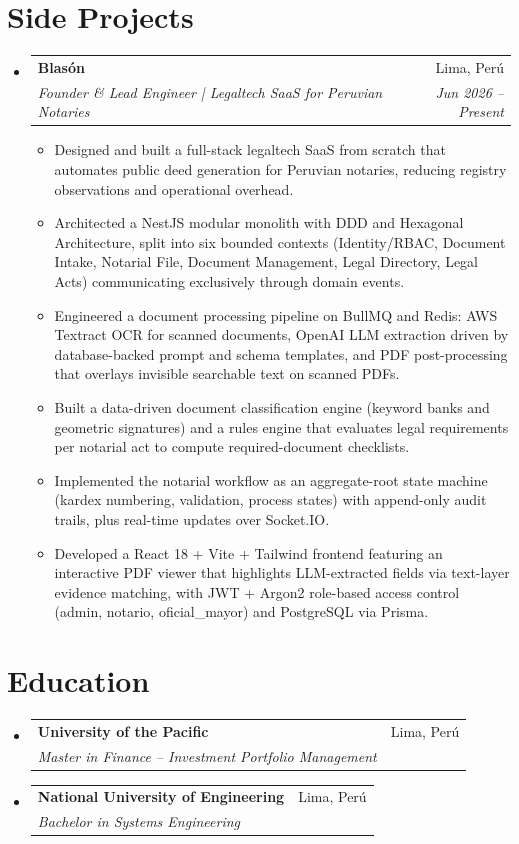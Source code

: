 \documentclass[letterpaper,11pt]{article}
\makeatletter
\newcommand{\resumeSubheading}[4]{
  \vspace{-1pt}\item
    \begin{tabular*}{0.97\textwidth}[t]{l@{\extracolsep{\fill}}r}
      \textbf{#1} & #2 \\
      \textit{\small#3} & \textit{\small #4} \\
    \end{tabular*}\vspace{-5pt}
}
\newcommand{\resumeSubHeadingListStart}{\begin{itemize}[leftmargin=*]}
\newcommand{\resumeSubHeadingListEnd}{\end{itemize}}
\newcommand{\resumeItemListStart}{\begin{itemize}[leftmargin=0.2in]}
\newcommand{\resumeItemListEnd}{\end{itemize}\vspace{-5pt}}
\makeatother
\begin{document}
\section{Side Projects}
\resumeSubHeadingListStart
  \resumeSubheading
    {Blasón}{Lima, Perú}
    {Founder \& Lead Engineer | Legaltech SaaS for Peruvian Notaries}{Jun 2026 -- Present}
    \resumeItemListStart
      \item Designed and built a full-stack legaltech SaaS from scratch that automates public deed generation for Peruvian notaries, reducing registry observations and operational overhead.
      \item Architected a NestJS modular monolith with DDD and Hexagonal Architecture, split into six bounded contexts (Identity/RBAC, Document Intake, Notarial File, Document Management, Legal Directory, Legal Acts) communicating exclusively through domain events.
      \item Engineered a document processing pipeline on BullMQ and Redis: AWS Textract OCR for scanned documents, OpenAI LLM extraction driven by database-backed prompt and schema templates, and PDF post-processing that overlays invisible searchable text on scanned PDFs.
      \item Built a data-driven document classification engine (keyword banks and geometric signatures) and a rules engine that evaluates legal requirements per notarial act to compute required-document checklists.
      \item Implemented the notarial workflow as an aggregate-root state machine (kardex numbering, validation, process states) with append-only audit trails, plus real-time updates over Socket.IO.
      \item Developed a React 18 + Vite + Tailwind frontend featuring an interactive PDF viewer that highlights LLM-extracted fields via text-layer evidence matching, with JWT + Argon2 role-based access control (admin, notario, oficial\_mayor) and PostgreSQL via Prisma.
    \resumeItemListEnd
\resumeSubHeadingListEnd

\section{Education}
\resumeSubHeadingListStart
  \resumeSubheading
    {University of the Pacific}{Lima, Perú}
    {Master in Finance -- Investment Portfolio Management}{}
  \resumeSubheading
    {National University of Engineering}{Lima, Perú}
    {Bachelor in Systems Engineering}{}
\resumeSubHeadingListEnd
\end{document}
